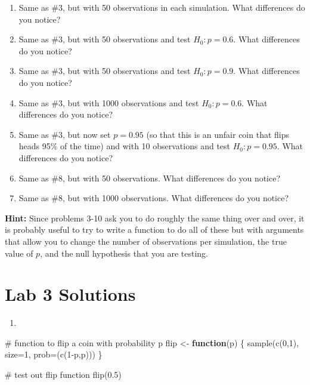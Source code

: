 \documentclass[
  letterpaper,
  DIV=11,
  numbers=noendperiod]{scrreprt}
\newenvironment{Shaded}{\begin{snugshade}}{\end{snugshade}}
\newcommand{\AttributeTok}[1]{\textcolor[rgb]{0.40,0.45,0.13}{#1}}
\newcommand{\CommentTok}[1]{\textcolor[rgb]{0.37,0.37,0.37}{#1}}
\newcommand{\ControlFlowTok}[1]{\textcolor[rgb]{0.00,0.23,0.31}{\textbf{#1}}}
\newcommand{\DecValTok}[1]{\textcolor[rgb]{0.68,0.00,0.00}{#1}}
\newcommand{\FloatTok}[1]{\textcolor[rgb]{0.68,0.00,0.00}{#1}}
\newcommand{\FunctionTok}[1]{\textcolor[rgb]{0.28,0.35,0.67}{#1}}
\newcommand{\NormalTok}[1]{\textcolor[rgb]{0.00,0.23,0.31}{#1}}
\newcommand{\OtherTok}[1]{\textcolor[rgb]{0.00,0.23,0.31}{#1}}
\newcommand{\SpecialCharTok}[1]{\textcolor[rgb]{0.37,0.37,0.37}{#1}}
\providecommand{\tightlist}{%
  \setlength{\itemsep}{0pt}\setlength{\parskip}{0pt}}\usepackage{longtable,booktabs,array}
\begin{document}
\begin{enumerate}
\def\labelenumi{\arabic{enumi}.}
\setcounter{enumi}{3}
\item
  Same as \#3, but with 50 observations in each simulation. What
  differences do you notice?
\item
  Same as \#3, but with 50 observations and test \(H_0:p=0.6\). What
  differences do you notice?
\item
  Same as \#3, but with 50 observations and test \(H_0:p=0.9\). What
  differences do you notice?
\item
  Same as \#3, but with 1000 observations and test \(H_0:p=0.6\). What
  differences do you notice?
\item
  Same as \#3, but now set \(p=0.95\) (so that this is an unfair coin
  that flips heads 95\% of the time) and with 10 observations and test
  \(H_0:p=0.95\). What differences do you notice?
\item
  Same as \#8, but with 50 observations. What differences do you notice?
\item
  Same as \#8, but with 1000 observations. What differences do you
  notice?
\end{enumerate}

\textbf{Hint:} Since problems 3-10 ask you to do roughly the same thing
over and over, it is probably useful to try to write a function to do
all of these but with arguments that allow you to change the number of
observations per simulation, the true value of \(p\), and the null
hypothesis that you are testing.

\section{Lab 3 Solutions}\label{lab-3-solutions}

\begin{enumerate}
\def\labelenumi{\arabic{enumi}.}
\tightlist
\item
\end{enumerate}

\begin{Shaded}
\begin{Highlighting}[]
\CommentTok{\# function to flip a coin with probability p}
\NormalTok{flip }\OtherTok{\textless{}{-}} \ControlFlowTok{function}\NormalTok{(p) \{}
  \FunctionTok{sample}\NormalTok{(}\FunctionTok{c}\NormalTok{(}\DecValTok{0}\NormalTok{,}\DecValTok{1}\NormalTok{), }\AttributeTok{size=}\DecValTok{1}\NormalTok{, }\AttributeTok{prob=}\NormalTok{(}\FunctionTok{c}\NormalTok{(}\DecValTok{1}\SpecialCharTok{{-}}\NormalTok{p,p)))}
\NormalTok{\}}

\CommentTok{\# test out flip function}
\FunctionTok{flip}\NormalTok{(}\FloatTok{0.5}\NormalTok{)}
\end{Highlighting}
\end{Shaded}
\end{document}
